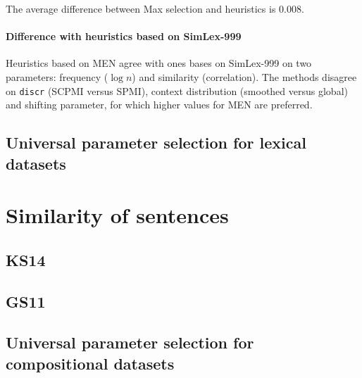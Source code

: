 The average difference between Max selection and heuristics is 0.008.

\paragraph{Difference with heuristics based on SimLex-999}

Heuristics based on MEN agree with ones bases on SimLex-999 on two parameters: frequency ($\log n$) and similarity (correlation). The methods disagree on \texttt{discr} (SCPMI versus SPMI), context distribution (smoothed versus global) and shifting parameter, for which higher values for MEN are preferred.

\subsection{Universal parameter selection for lexical datasets}
\label{sec:Universal-lexical-param-selection}



\section{Similarity of sentences}
\label{sec:sentential}

\subsection{KS14}
\label{sec:ks14}



\subsection{GS11}
\label{sec:gs11}




\subsection{Universal parameter selection for compositional datasets}
\label{sec:robust-param-comp-selecion}

